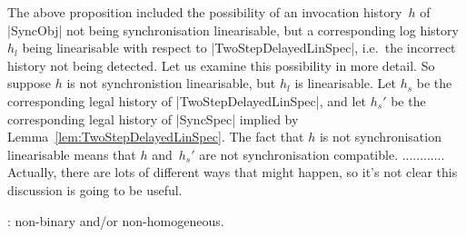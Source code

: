 The above proposition included the possibility of an invocation history~$h$ of
|SyncObj| not being synchronisation linearisable, but a corresponding log
history~$h_l$ being linearisable with respect to |TwoStepDelayedLinSpec|,
i.e.~the incorrect history not being detected.  Let us examine this
possibility in more detail.  So suppose $h$ is not synchronistion
linearisable, but $h_l$ is linearisable.  Let $h_s$ be the corresponding legal
history of |TwoStepDelayedLinSpec|, and let $h_s'$ be the corresponding legal
history of |SyncSpec| implied by Lemma~\ref{lem:TwoStepDelayedLinSpec}.  The
fact that $h$ is not synchronisation linearisable means that $h$ and~$h_s'$
are not synchronisation compatible. ............ Actually, there are lots of
different ways that might happen, so it's not clear this discussion is going
to be useful. 


: non-binary and/or non-homogeneous. 







